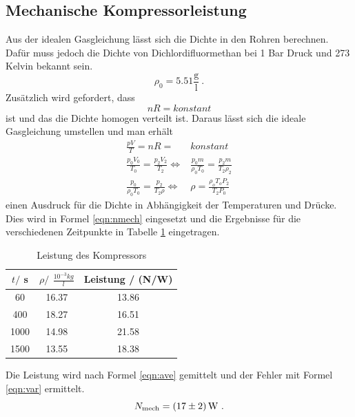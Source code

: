 \subsection{Mechanische Kompressorleistung}
Aus der idealen Gasgleichung lässt sich die Dichte in den Rohren berechnen. Dafür muss jedoch die Dichte von Dichlordifluormethan bei 1 Bar Druck und 273 Kelvin bekannt sein.
\begin{equation}
  \rho_\text{0} =  5.51 \frac{\text{g}}{\text{l}} \ .
  \label{rho}
\end{equation}
Zusätzlich wird gefordert, dass
\begin{equation}
  nR = konstant
\end{equation}
ist und das die Dichte homogen verteilt ist. Daraus lässt sich die ideale Gasgleichung umstellen und man erhält
\begin{eqnarray*}
  \frac{pV}{T} =nR =& konstant \\
  \frac{p_0 V_0}{T_0} = \frac{p_2 V_2}{T_\text{2}}  \Leftrightarrow&  \frac{p_0 m}{\rho_0 T_0} = \frac{p_2 m}{T_\text{2} \rho_2} \\
  \frac{p_0}{\rho_0 T_0} = \frac{p_2}{T_\text{2} \rho} \Leftrightarrow& \rho = \frac{\rho_o T_o P_2}{T_\text{2} P_0}
  \label{eqn:rho}
\end{eqnarray*}
einen Ausdruck für die Dichte in Abhängigkeit der Temperaturen und Drücke. Dies wird in Formel \ref{eqn:nmech} eingesetzt und die Ergebnisse für die verschiedenen Zeitpunkte in Tabelle \ref{tab:LdK} eingetragen.
\begin{table}
  \centering
  \begin{tabular}{c c c}
    \toprule
    $t /$ s & $\rho /$ $\frac{10^{-3}kg}{l}$ & Leistung / (N/W) \\
    \midrule
    60   & 16.37 & 13.86 \\
    400  & 18.27 & 16.51 \\
    1000 & 14.98 & 21.58 \\
    1500 & 13.55 & 18.38 \\
    \bottomrule
  \end{tabular}
  \caption{Leistung des Kompressors}
  \label{tab:LdK}
\end{table}
Die Leistung wird nach Formel \ref{eqn:ave} gemittelt und der Fehler mit Formel \ref{eqn:var} ermittelt.
\begin{equation}
  N_{\text{mech}} = ( \num{17 +- 2} ) \, \text{W} \ .
\end{equation}
